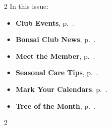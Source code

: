 \setlength{\columnsep}{-5.0cm}
\begin{multicols}{2}
    \noindent\textsf{In this issue:}
    \begin{itemize}
        \item \textsf{\textbf{Club Events}}, p.~\pageref{2025-08-calendar}.
        \item \textsf{\textbf{Bonsai Club News}}, p.~\pageref{2025-08-news}.
        \item \textsf{\textbf{Meet the Member}}, p.~\pageref{2025-08-roots}.
        \item \textsf{\textbf{Seasonal Care Tips}}, p.~\pageref{2025-08-care}.
        \item \textsf{\textbf{Mark Your Calendars}}, p.~\pageref{2025-08-events}.
        \item \textsf{\textbf{Tree of the Month}}, p.~\pageref{2025-08-contest}.
    \end{itemize}
    \vfill\null
    \columnbreak

    
\end{multicols}
\pagebreak

\setlength{\columnsep}{0.5cm}
\begin{multicols}{2}
    
    
    
    
    
    
    
    
\end{multicols}
